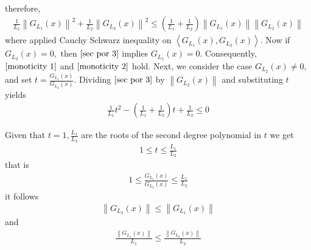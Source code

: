 \documentclass{ExerciseSheet}
\begin{document}
\begin{solution}
\begin{enumerate}
\begin{align*}
        \end{align*}
    therefore,
       \begin{align}\label{sec por 3}
            \frac{1}{L_1}\left\|G_{L_1}(x)\right\|^2+\frac{1}{L_2}\left\|G_{L_2}(x)\right\|^2\leq \left(\frac{1}{L_1} +\frac{1}{L_2}\right)\left\|G_{L_1}(x)\right\|\left\|G_{L_2}(x)\right\|
        \end{align}
      where applied Cauchy Schwarz inequality on $\left<G_{L_1}(x),G_{L_2}(x)\right>.$ Now if $G_{L_2}(x)=0,$ then $\eqref{sec por 3}$ implies $G_{L_1}(x)=0.$ Consequently, $\eqref{monoticity 1}$ and $\eqref{monoticity 2}$ hold. Next, we consider the case $G_{L_2}(x)\neq0,$ and set $t=\frac{G_{L_1}(x)}{G_{L_2}(x)}.$ Dividing $\eqref{sec por 3}$ by $\left\|G_{L_2}(x)\right\|$ and substituting $t$ yields
        \begin{align*}
            \frac{1}{L_1}t^2- \left(\frac{1}{L_1} +\frac{1}{L_2}\right)t+\frac{1}{L_2}\leq 0
        \end{align*}

    Given that $t=1,\frac{L_1}{L_2}$ are the roots of the second degree polynomial in $t$ we get
        \begin{align*}
            1\leq t\leq\frac{L_1}{L_2}
        \end{align*}
    that is 
       \begin{align*}
            1\leq \frac{G_{L_1}(x)}{G_{L_2}(x)}\leq\frac{L_1}{L_2}
        \end{align*}
    it follows
      \begin{align*}
            \left\|G_{L_2}(x)\right\| \leq \left\|G_{L_1}(x)\right\|
        \end{align*}
 and 
     \begin{align*}
            \frac{\left\|G_{L_1}(x)\right\|}{L_1} \leq  \frac{\left\|G_{L_2}(x)\right\|}{L_2}
        \end{align*}


\end{enumerate}
\end{solution}
\end{document}
